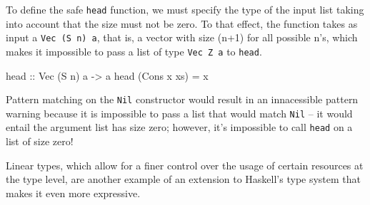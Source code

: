 \documentclass[]{lwnovathesis}
\begin{document}
To define the safe \texttt{head} function, we must specify the type of the input
list taking into account that the size must not be zero. To that effect, the
function takes as input a \texttt{Vec (S n) a}, that is, a vector with size
(n+1) for all possible n's, which makes it impossible to pass a list of type
\texttt{Vec Z a} to \texttt{head}.

\begin{code}
    head :: Vec (S n) a -> a
    head (Cons x xs) = x
\end{code}

Pattern matching on the \texttt{Nil} constructor would result in an innacessible
pattern warning because it is impossible to pass a list that would match
\texttt{Nil} -- it would entail the argument list has size zero; however, it's
impossible to call \texttt{head} on a list of size zero!

Linear types, which allow for a finer control over the usage of certain resources at the type
level, are another example of an extension to Haskell's type system
that makes it even more expressive.


\end{document}
